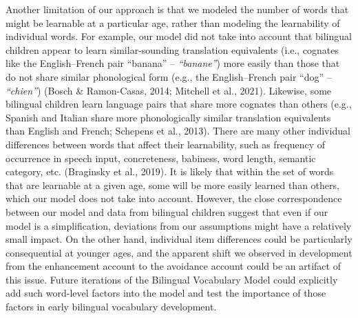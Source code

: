 \documentclass[
  english,
  ,man,floatsintext]{apa6}
\begin{document}
Another limitation of our approach is that we modeled the number of words that might be learnable at a particular age, rather than modeling the learnability of individual words. For example, our model did not take into account that bilingual children appear to learn similar-sounding translation equivalents (i.e., cognates like the English--French pair ``banana'' -- \emph{``banane''}) more easily than those that do not share similar phonological form (e.g., the English--French pair ``dog'' -- \emph{``chien''}) (Bosch \& Ramon-Casas, 2014; Mitchell et al., 2021). Likewise, some bilingual children learn language pairs that share more cognates than others (e.g., Spanish and Italian share more phonologically similar translation equivalents than English and French; Schepens et al., 2013). There are many other individual differences between words that affect their learnability, such as frequency of occurrence in speech input, concreteness, babiness, word length, semantic category, etc. (Braginsky et al., 2019). It is likely that within the set of words that are learnable at a given age, some will be more easily learned than others, which our model does not take into account. However, the close correspondence between our model and data from bilingual children suggest that even if our model is a simplification, deviations from our assumptions might have a relatively small impact. On the other hand, individual item differences could be particularly consequential at younger ages, and the apparent shift we observed in development from the enhancement account to the avoidance account could be an artifact of this issue. Future iterations of the Bilingual Vocabulary Model could explicitly add such word-level factors into the model and test the importance of those factors in early bilingual vocabulary development.
\end{document}
